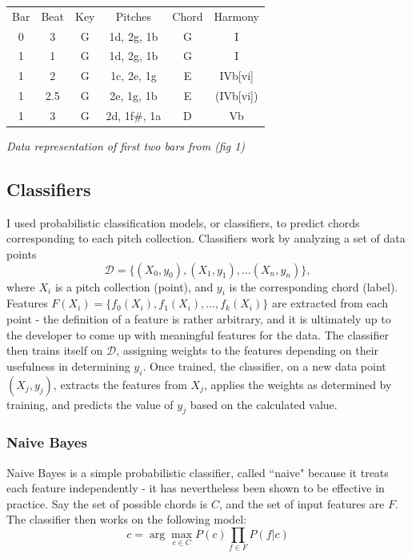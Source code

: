 \documentclass[12pt]{article}
\begin{document}
\begin{center}
  \begin{tabular}{ c | c | c | c || c | c }
    Bar & Beat & Key & Pitches & Chord & Harmony\\
    0 & 3 & G & 1d, 2g, 1b & G & I\\ \hline
    1 & 1 & G & 1d, 2g, 1b & G & I\\ \hline
    1 & 2 & G & 1c, 2e, 1g & E & IVb[vi]\\ \hline
    1  & 2.5 & G & 2e, 1g, 1b & E & (IVb[vi])\\ \hline
    1 & 3 & G & 2d, 1f\#, 1a & D & Vb \\
  \end{tabular}
\end{center}
\begin{center}\emph{Data representation of first two bars from (fig 1)}\\ \end{center}
\newpage

\subsection{Classifiers}
I used probabilistic classification models, or classifiers, to predict chords corresponding to each pitch collection. Classifiers work by analyzing a set of data points $$\mathcal{D} = \{(X_0,y_0), (X_1,y_1), ... (X_n,y_n)\},$$ where $X_i$ is a pitch collection (point), and $y_i$ is the corresponding chord (label). Features $F(X_i) = \{f_0(X_i), f_1(X_i), ..., f_k(X_i)\}$ are extracted from each point - the definition of a feature is rather arbitrary, and it is ultimately up to the developer to come up with meaningful features for the data. The classifier then trains itself on $\mathcal{D}$, assigning weights to the features depending on their usefulness in determining $y_i$. Once trained, the classifier, on a new data point $(X_j,y_j)$, extracts the features from $X_j$, applies the weights as determined by training, and predicts the value of $y_j$ based on the calculated value. 

\subsubsection{Naive Bayes}
Naive Bayes is a simple probabilistic classifier, called ``naive" because it treats each feature independently - it has nevertheless been shown to be effective in practice. Say the set of possible chords is $C$, and the set of input features are $F$. The classifier then works on the following model: 
$$c = \arg \max_{c \in C} P(c) \prod_{f \in F} P(f|c)$$
\end{document}
